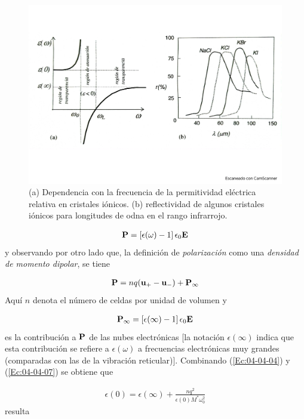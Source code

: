 \begin{figure}[h!] \centering
	\includegraphics[scale=0.4]{Cuerpo/Ch_04/Fotos libro 8.pdf}
	\caption{(a) Dependencia con la frecuencia de la permitividad eléctrica relativa en cristales iónicos. (b) reflectividad de algunos cristales iónicos para longitudes de odna en el rango infrarrojo.}
	\label{Fig:04-08}
\end{figure}    


\begin{eqnarray}
	\mathbf{P} = \left[ \epsilon (\omega) -1  \right] \epsilon_0  \mathbf{E}
\end{eqnarray}
y observando por otro lado que, la definición de \textit{polarización} como una \textit{densidad de momento dipolar}, se tiene  

\begin{eqnarray}
	\mathbf{P} = n q (\mathbf{u}_+ - \mathbf{u}_-) + \mathbf{P}_\infty
\end{eqnarray}
Aquí $n$ denota el número de celdas por unidad de volumen y 

\begin{eqnarray}
	\mathbf{P}_\infty = \left[ \epsilon (\infty) -1  \right] \epsilon_0 \mathbf{E}\label{Ec:04-04-07}
\end{eqnarray}
es la contribución a $\mathbf{P}$ de las nubes electrónicas [la notación $\epsilon (\infty)$ indica que esta contribución se refiere a $\epsilon (\omega)$ a frecuencias electrónicas muy grandes (comparadas con las de la vibración reticular)]. Combinando (\ref{Ec:04-04-04}) y (\ref{Ec:04-04-07}) se obtiene que

\begin{eqnarray}
	\epsilon(0) = \epsilon(\infty)  + \frac{nq^2}{\epsilon(0) M^*\omega_0^2}
\end{eqnarray}
resulta 

